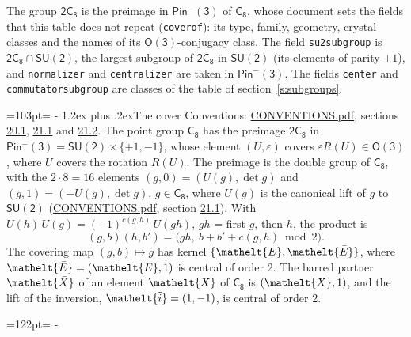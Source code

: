 \documentclass[10pt,a4paper]{article}
\makeatletter
\renewcommand\section{\@startsection{section}{1}{\z@}{-3ex plus -1ex minus -.2ex}%
  {1.2ex plus .2ex}{\normalfont\large\sffamily\bfseries\color{parttitle}}}
\newcommand{\needspace}[1]{\par\penalty-100\begingroup\dimen0=#1\relax\dimen2=\pagegoal
  \advance\dimen2-\pagetotal\ifdim\dimen0>\dimen2\relax\ifdim\dimen2>0pt\vfil\break\fi\fi
  \endgroup}
\numberwithin{equation}{section}
\newcommand{\eltfont}[1]{{\let\sigma\eltsigma\mathelt{#1}}}
\newcommand{\grp}[1]{\mathsf{#1}}
\newcommand{\elt}[1]{\eltfont{#1}}
\newcommand{\dirprod}{\times}
\newcommand{\barred}[1]{\bar{#1}}
\newcommand{\lift}[1]{\tilde{#1}}
\makeatother
\begin{document}
\leavevmode\label{n:element.inversion}\label{n:group.preimage}The group $\grp{2C_{8}}$ is the preimage in $\grp{Pin^{-}(3)}$ of \href{../../../rotation/data/pdf/C8.pdf}{$\grp{C_{8}}$}, whose document sets the fields that this table does not repeat (\texttt{coverof}): its type, family, geometry, crystal classes and the names of its \href{../../../rotation/data/pdf/O3.pdf}{$\grp{O(3)}$}-conjugacy class. The field \texttt{su2subgroup} is $\grp{2C_{8}} \cap \grp{SU(2)}$, the largest subgroup of $\grp{2C_{8}}$ in $\grp{SU(2)}$ (its elements of parity $+1$), and \texttt{normalizer} and \texttt{centralizer} are taken in $\grp{Pin^{-}(3)}$. The fields \texttt{center} and \texttt{commutatorsubgroup} are classes of the table of section~\ref{s:subgroups}.
\needspace{103pt}
\section{The cover}\label{s:cover}
Conventions: \href{../../CONVENTIONS.pdf}{CONVENTIONS.pdf}, sections \href{../../CONVENTIONS.pdf\#conv.20.1}{20.1}, \href{../../CONVENTIONS.pdf\#conv.21.1}{21.1} and \href{../../CONVENTIONS.pdf\#conv.21.2}{21.2}.
\leavevmode\label{n:group.pin.minus}\label{n:group.su2}\label{n:local.pin.sign}\label{n:matrix.covered}\label{n:matrix.lift.su2}\label{n:index.bar}The point group $\grp{C_{8}}$ has the preimage $\grp{2C_{8}}$ in $\grp{Pin^{-}(3)} = \grp{SU(2)} \dirprod \{+1, -1\}$, whose element $(U, \varepsilon)$ covers $\varepsilon R(U) \in \grp{O(3)}$, where $U$ covers the rotation $R(U)$. The preimage is the double group of $\grp{C_{8}}$, with the $2 \cdot 8 = 16$ elements $(g, 0) = (U(g), \det g)$ and $(g, 1) = (-U(g), \det g)$, $g \in \grp{C_{8}}$, where $U(g)$ is the canonical lift of $g$ to $\grp{SU(2)}$ (\href{../../CONVENTIONS.pdf}{CONVENTIONS.pdf}, section \href{../../CONVENTIONS.pdf\#conv.21.1}{21.1}). \label{n:function.cocycle}With $U(h)\,U(g) = (-1)^{c(g,h)}\,U(gh)$, $gh$ = first $g$, then $h$, the product is
\begin{equation}\label{e:product}(g, b)(h, b') = \bigl(gh,\ b + b' + c(g, h) \bmod 2\bigr).\end{equation}
\leavevmode\label{n:mark.bar}The covering map $(g, b) \mapsto g$ has kernel $\{\elt{E}, \elt{\barred{E}}\}$, where $\elt{\barred{E}} = (\elt{E}, 1)$ is central of order 2. \label{n:element.named}\label{n:mark.lift}The barred partner $\elt{\barred{X}}$ of an element $\elt{X}$ of $\grp{C_{8}}$ is $(\elt{X}, 1)$, and the lift of the inversion, $\elt{\lift{i}} = (1, -1)$, is central of order 2.
\needspace{122pt}
\end{document}
